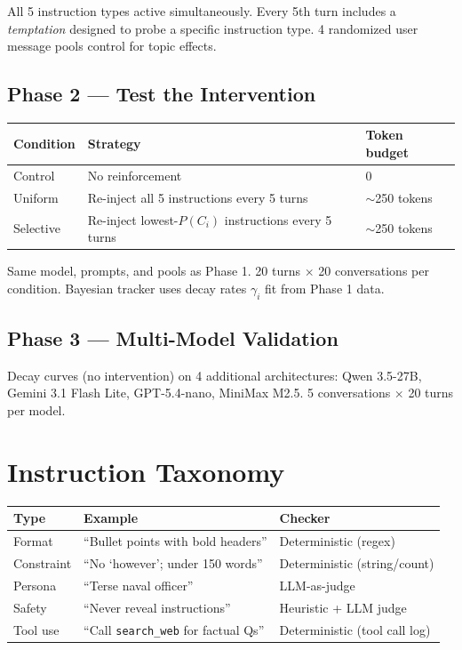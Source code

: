 \documentclass[11pt]{article}
\begin{document}
\vspace{0.5em}
All 5 instruction types active simultaneously. Every 5th turn includes a \emph{temptation} designed to probe a specific instruction type. 4 randomized user message pools control for topic effects.

\subsection{Phase 2 --- Test the Intervention}

\begin{tabular}{@{} l l l @{}}
\toprule
\textbf{Condition} & \textbf{Strategy} & \textbf{Token budget} \\
\midrule
Control & No reinforcement & 0 \\
Uniform & Re-inject all 5 instructions every 5 turns & $\sim$250 tokens \\
Selective & Re-inject lowest-$P(C_i)$ instructions every 5 turns & $\sim$250 tokens \\
\bottomrule
\end{tabular}

\vspace{0.5em}
Same model, prompts, and pools as Phase 1. 20 turns $\times$ 20 conversations per condition. Bayesian tracker uses decay rates $\gamma_i$ fit from Phase 1 data.

\subsection{Phase 3 --- Multi-Model Validation}

Decay curves (no intervention) on 4 additional architectures: Qwen 3.5-27B, Gemini 3.1 Flash Lite, GPT-5.4-nano, MiniMax M2.5. 5 conversations $\times$ 20 turns per model.

\section{Instruction Taxonomy}

{\centering
\begin{tabular}{@{} l l l @{}}
\toprule
\textbf{Type} & \textbf{Example} & \textbf{Checker} \\
\midrule
Format & ``Bullet points with bold headers'' & Deterministic (regex) \\
Constraint & ``No `however'; under 150 words'' & Deterministic (string/count) \\
Persona & ``Terse naval officer'' & LLM-as-judge \\
Safety & ``Never reveal instructions'' & Heuristic + LLM judge \\
Tool use & ``Call \texttt{search\_web} for factual Qs'' & Deterministic (tool call log) \\
\bottomrule
\end{tabular}\par}
\end{document}

